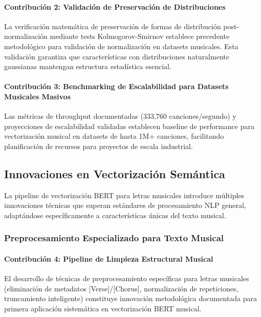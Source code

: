 \documentclass[12pt,a4paper]{article}
\begin{document}
\paragraph{Contribución 2: Validación de Preservación de Distribuciones}

La verificación matemática de preservación de formas de distribución post-normalización mediante tests Kolmogorov-Smirnov establece precedente metodológico para validación de normalización en datasets musicales. Esta validación garantiza que características con distribuciones naturalmente gaussianas mantengan estructura estadística esencial.

\paragraph{Contribución 3: Benchmarking de Escalabilidad para Datasets Musicales Masivos}

Las métricas de throughput documentadas (333,760 canciones/segundo) y proyecciones de escalabilidad validadas establecen baseline de performance para vectorización musical en datasets de hasta 1M+ canciones, facilitando planificación de recursos para proyectos de escala industrial.

\subsection{Innovaciones en Vectorización Semántica}

La pipeline de vectorización BERT para letras musicales introduce múltiples innovaciones técnicas que superan estándares de procesamiento NLP general, adaptándose específicamente a características únicas del texto musical.

\subsubsection{Preprocesamiento Especializado para Texto Musical}

\paragraph{Contribución 4: Pipeline de Limpieza Estructural Musical}

El desarrollo de técnicas de preprocesamiento específicas para letras musicales (eliminación de metadatos [Verse]/[Chorus], normalización de repeticiones, truncamiento inteligente) constituye innovación metodológica documentada para primera aplicación sistemática en vectorización BERT musical.
\end{document}
